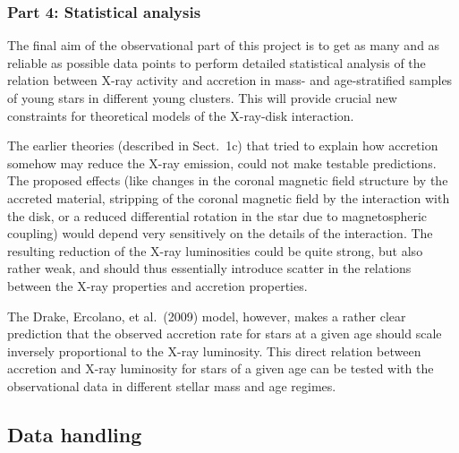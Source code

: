 \documentclass[10pt,fleqn,twoside]{article}
\begin{document}
\subsubsection*{Part 4:  Statistical analysis}


The final aim of the observational part of this project is to get as many and as reliable as 
possible data points to perform
 detailed statistical analysis
of the relation between X-ray activity and accretion in mass- and age-stratified
samples of young stars in different young clusters. This
will provide crucial new
constraints for theoretical models of the X-ray-disk interaction.

The earlier theories (described in Sect.~1c) that tried to explain how
accretion somehow may reduce the X-ray emission, 
could not make testable predictions.
The proposed effects (like changes in the coronal magnetic field structure by the
accreted material, stripping of the coronal magnetic field 
by the interaction with the disk, or a reduced differential rotation in the star
due to magnetospheric coupling) would depend very sensitively on the details
of the interaction. The resulting reduction of the X-ray luminosities could
be quite strong, but also rather weak, and should thus essentially introduce
scatter in the relations between the X-ray properties and accretion properties.

The Drake, Ercolano, et al.~(2009) model, however, makes a rather clear
prediction that the observed accretion rate for stars at a given age
should scale inversely proportional to the X-ray luminosity.
This direct relation between accretion and X-ray luminosity for stars of a given
age can be tested with
the observational data in different stellar mass and age regimes.


\subsection{Data handling}
\end{document}

